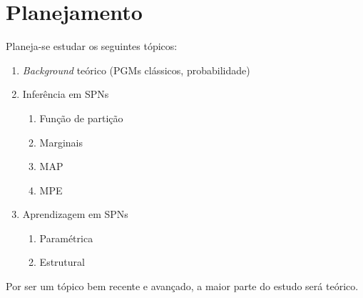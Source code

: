 \documentclass{amsart}
\theoremstyle{plain}
\numberwithin{equation}{subsection}
\begin{document}
\section{Planejamento}

Planeja-se estudar os seguintes tópicos:

\begin{enumerate}
  \item \textit{Background} teórico (PGMs clássicos, probabilidade)
  \item Inferência em SPNs
    \begin{enumerate}
      \item Função de partição
      \item Marginais
      \item MAP
      \item MPE
    \end{enumerate}
  \item Aprendizagem em SPNs
    \begin{enumerate}
      \item Paramétrica
      \item Estrutural
    \end{enumerate}
\end{enumerate}

Por ser um tópico bem recente e avançado, a maior parte do estudo será teórico.


\newpage
\appendix

\newpage

\printbibliography[]
\end{document}
